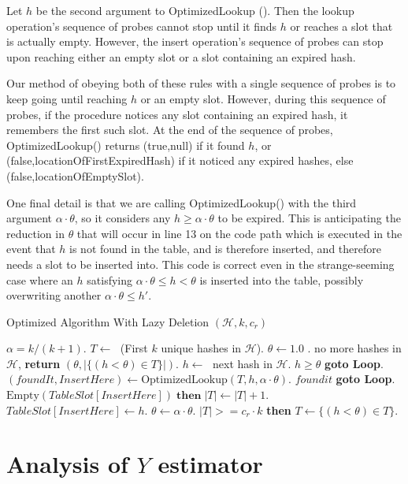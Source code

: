 \documentclass{sig-alternate}
\begin{document}
Let $h$ be the second argument to OptimizedLookup (). Then the lookup operation's sequence of probes cannot stop until
it finds $h$ or reaches a slot that is actually empty. However, the insert operation's sequence of probes
can stop upon reaching either an empty slot or a slot containing an expired hash.

Our method of obeying both of these rules with a single sequence of probes is to keep going
until reaching $h$ or an empty slot. However, during this sequence of probes, if the procedure
notices any slot containing an expired hash, it remembers the first such slot. At the end
of the sequence of probes, OptimizedLookup() returns (true,null) if it found $h$, or 
(false,locationOfFirstExpiredHash) if it noticed any expired hashes, else 
(false,locationOfEmptySlot).

One final detail is that we are calling OptimizedLookup() with the
third argument $\alpha \cdot \theta$, so it considers any $h \ge
\alpha \cdot \theta$ to be expired. This is anticipating the reduction in 
$\theta$ that will occur in line 13 on the code path which is executed in the
event that $h$ is not found in the table, and is therefore inserted, and therefore needs
a slot to be inserted into.
This code is correct even in the strange-seeming case where an $h$ satisfying
$\alpha \cdot \theta \le h < \theta$ is inserted into the table, possibly overwriting another 
$\alpha \cdot \theta \le h'$.


\begin{algorithm}[t]
\caption{Optimized Algorithm With Lazy Deletion $(\mathcal{H},k,c_r)$}
\label{alg:optimized-algo}
\begin{algorithmic}[1]{\footnotesize
\STATE $\alpha = k/(k+1)$.
\STATE $T \leftarrow\;$ (First $k$ unique hashes in $\mathcal{H}$).
\STATE $ \theta \leftarrow 1.0 $
\STATE {}.
 no more hashes in $\mathcal{H}$, {\bf return} $(\theta,|\{(h < \theta) \in T\}|)$.
\STATE $h \leftarrow\;$ next hash in $\mathcal{H}$.
 $h \ge \theta$ {\bf goto Loop}.
\STATE $(foundIt,InsertHere) \leftarrow \mathrm{OptimizedLookup}(T,h,\alpha \cdot \theta)$.
 $foundit$ {\bf goto Loop}.
 $\mathrm{Empty}(TableSlot[InsertHere])\;\mathbf{then}\; |T| \leftarrow |T|\!+\!1$.
\STATE $TableSlot[InsertHere] \leftarrow h$.
\STATE $\theta \leftarrow \alpha \cdot \theta$.
 $|T| >= c_r \cdot k$ {\bf then} $T \leftarrow \{(h < \theta) \in T\}$.
}\end{algorithmic}
\end{algorithm}



\section{Analysis of $Y$ estimator}

\end{document}
